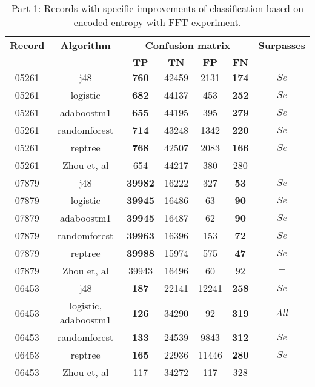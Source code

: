 \begin{table}[h]
\begin{center}
\begin{threeparttable}
\caption{Part 1: Records with specific improvements of classification based on encoded entropy with FFT experiment.}
\label{table:encoded_fft_1}
\scriptsize
  \begin{tabular}{c c c c c c c}
  \toprule
  \textbf{Record} & \textbf{Algorithm} & \multicolumn{4}{c}{\textbf{Confusion matrix}} & \textbf{Surpasses}\\
  \cline{3-6}
  \\
  & & $\mathbf{TP}$ & $\mathbf{TN}$ & $\mathbf{FP}$ & $\mathbf{FN}$\\
  \midrule  
    05261 & j48 & \textbf{760} & 42459 & 2131 & \textbf{174} & $Se$ \\
    05261 & logistic & \textbf{682} & 44137 & 453 & \textbf{252} & $Se$ \\
    05261 & adaboostm1 & \textbf{655} & 44195 & 395 & \textbf{279} & $Se$ \\
    05261 & randomforest & \textbf{714} & 43248 & 1342 & \textbf{220} & $Se$ \\
    05261 & reptree & \textbf{768} & 42507 & 2083 & \textbf{166} & $Se$ \\
    05261 & Zhou et, al & 654 & 44217 & 380 & 280 & $-$ \\
    \hline
    07879 & j48 & \textbf{39982} & 16222 & 327 & \textbf{53} & $Se$ \\
    07879 & logistic & \textbf{39945} & 16486 & 63 & \textbf{90} & $Se$ \\
    07879 & adaboostm1 & \textbf{39945} & 16487 & 62 & \textbf{90} & $Se$ \\
    07879 & randomforest & \textbf{39963} & 16396 & 153 & \textbf{72} & $Se$ \\
    07879 & reptree & \textbf{39988} & 15974 & 575 & \textbf{47} & $Se$ \\
    07879 & Zhou et, al & 39943 & 16496 & 60 & 92 & $-$ \\
    \hline
    06453 & j48 & \textbf{187} & 22141 & 12241 & \textbf{258} & $Se$ \\
    06453 & logistic, adaboostm1 & \textbf{126} & 34290 & 92 & \textbf{319} & $All$ \\
    06453 & randomforest & \textbf{133} & 24539 & 9843 & \textbf{312} & $Se$ \\
    06453 & reptree & \textbf{165} & 22936 & 11446 & \textbf{280} & $Se$ \\
    06453 & Zhou et, al & 117 & 34272 & 117 & 328 & $-$ \\

\end{tabular}
\end{threeparttable}
\end{center}
\end{table}
